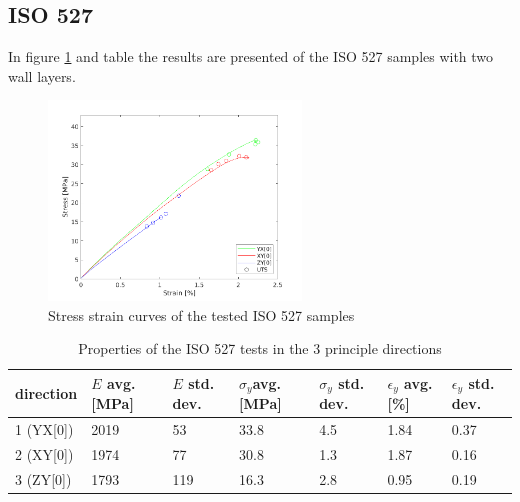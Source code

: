 \subsection{ISO 527}
In figure \ref{fig:ISO527results} and table \label{tab:ISO527results} the results are presented of the ISO 527 samples with two wall layers.
\begin{figure}[H]
    \centering
    \includegraphics[width=0.60\textwidth]{chapter_5_Experimentaltesting/figures/ISOTensiletests.png}
    \caption{Stress strain curves of the tested ISO 527 samples}
    \label{fig:ISO527results}
\end{figure}

\begin{table}[ht]
\centering
\caption{Properties of the ISO 527 tests in the 3 principle directions}
          \label{tab:ISO527results}
\begin{tabular}{ p{1.5cm}p{1cm}p{1cm}p{1cm}p{1cm}p{1cm}p{1cm}  }
\hline
direction & $E$ avg. [MPa] & $E$ std. dev. & $\sigma_y$avg. [MPa] & $\sigma_y$ std. dev. & $\epsilon_y$ avg. [\%] & $\epsilon_y$   std. dev. \\
 \hline
1 (YX[0]) & 2019 & 53 & 33.8 & 4.5 & 1.84 & 0.37 \\
2 (XY[0]) & 1974 & 77 & 30.8 & 1.3 & 1.87 & 0.16 \\
3 (ZY[0]) & 1793 & 119 & 16.3 & 2.8 & 0.95 & 0.19\\
 \hline
\end{tabular}
\end{table}



